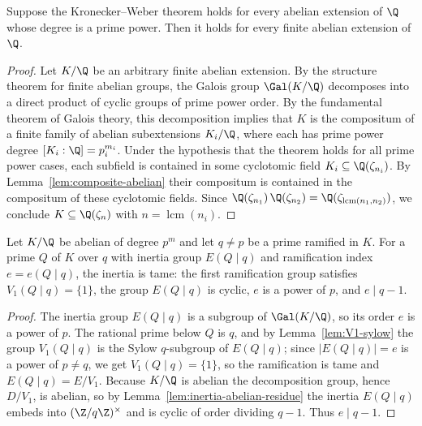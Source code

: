 \begin{lemma}
  \label{lem:reduction-prime-power}
  Suppose the Kronecker--Weber theorem holds for every abelian extension of
  $\Q$ whose degree is a prime power. Then it holds for every finite abelian
  extension of $\Q$.
\end{lemma}
\begin{proof}
  Let $K/\Q$ be an arbitrary finite abelian extension. By the structure theorem
  for finite abelian groups, the Galois group $\Gal(K/\Q)$ decomposes into a
  direct product of cyclic groups of prime power order. By the fundamental
  theorem of Galois theory, this decomposition implies that $K$ is the
  compositum of a finite family of abelian subextensions $K_i/\Q$, where each
  has prime power degree $[K_i : \Q] = p_i^{m_i}$. Under the hypothesis that the
  theorem holds for all prime power cases, each subfield is contained in some
  cyclotomic field $K_i \subseteq \Q(\zeta_{n_i})$. By
  Lemma~\ref{lem:composite-abelian} their compositum is contained in the
  compositum of these cyclotomic fields. Since
  $\Q(\zeta_{n_1})\,\Q(\zeta_{n_2}) = \Q(\zeta_{\operatorname{lcm}(n_1,n_2)})$,
  we conclude $K \subseteq \Q(\zeta_n)$ with $n = \operatorname{lcm}(n_i)$.
\end{proof}

\begin{lemma}
  \label{lem:tame-inertia}
  Let $K/\Q$ be abelian of degree $p^m$ and let $q \neq p$ be a prime ramified
  in $K$. For a prime $Q$ of $K$ over $q$ with inertia group $E(Q \mid q)$ and
  ramification index $e = e(Q \mid q)$, the inertia is tame: the first
  ramification group satisfies $V_1(Q \mid q) = \{1\}$, the group $E(Q \mid q)$
  is cyclic, $e$ is a power of $p$, and $e \mid q - 1$.
\end{lemma}
\begin{proof}
  The inertia group $E(Q \mid q)$ is a subgroup of $\Gal(K/\Q)$, so its order
  $e$ is a power of $p$. The rational prime below $Q$ is $q$, and by
  Lemma~\ref{lem:V1-sylow} the group $V_1(Q \mid q)$ is the Sylow $q$-subgroup
  of $E(Q \mid q)$; since $|E(Q \mid q)| = e$ is a power of $p \neq q$, we get
  $V_1(Q \mid q) = \{1\}$, so the ramification is tame and $E(Q \mid q) =
  E/V_1$. Because $K/\Q$ is abelian the decomposition group, hence $D/V_1$, is
  abelian, so by Lemma~\ref{lem:inertia-abelian-residue} the inertia $E(Q \mid
  q)$ embeds into $(\Z/q\Z)^\times$ and is cyclic of order dividing $q - 1$.
  Thus $e \mid q - 1$.
\end{proof}

